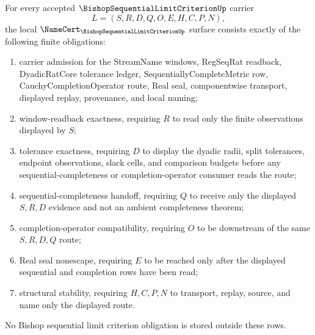 \begin{theorem}
\label{thm:bishop-sequential-limit-criterion-namecert-obligations}
For every accepted $\BishopSequentialLimitCriterionUp$ carrier
$$
L=(S,R,D,Q,O,E,H,C,P,N),
$$
the local $\NameCert_{\BishopSequentialLimitCriterionUp}$ surface consists exactly of the following finite obligations:
\begin{enumerate}
\item carrier admission for the StreamName windows, RegSeqRat readback, DyadicRatCore tolerance ledger, SequentiallyCompleteMetric row, CauchyCompletionOperator route, Real seal, componentwise transport, displayed replay, provenance, and local naming;
\item window-readback exactness, requiring $R$ to read only the finite observations displayed by $S$;
\item tolerance exactness, requiring $D$ to display the dyadic radii, split tolerances, endpoint observations, slack cells, and comparison budgets before any sequential-completeness or completion-operator consumer reads the route;
\item sequential-completeness handoff, requiring $Q$ to receive only the displayed $S,R,D$ evidence and not an ambient completeness theorem;
\item completion-operator compatibility, requiring $O$ to be downstream of the same $S,R,D,Q$ route;
\item Real seal nonescape, requiring $E$ to be reached only after the displayed sequential and completion rows have been read;
\item structural stability, requiring $H,C,P,N$ to transport, replay, source, and name only the displayed route.
\end{enumerate}
No Bishop sequential limit criterion obligation is stored outside these rows.
\end{theorem}
